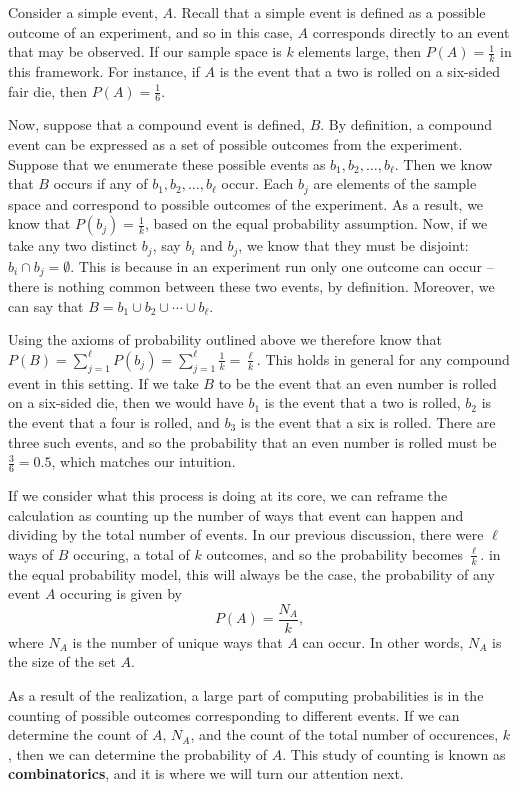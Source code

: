 \documentclass[
  letterpaper,
  DIV=11,
  numbers=noendperiod]{scrreprt}
\begin{document}
Consider a simple event, \(A\). Recall that a simple event is defined as
a possible outcome of an experiment, and so in this case, \(A\)
corresponds directly to an event that may be observed. If our sample
space is \(k\) elements large, then \(P(A) = \frac{1}{k}\) in this
framework. For instance, if \(A\) is the event that a two is rolled on a
six-sided fair die, then \(P(A) = \frac{1}{6}\).

Now, suppose that a compound event is defined, \(B\). By definition, a
compound event can be expressed as a set of possible outcomes from the
experiment. Suppose that we enumerate these possible events as
\(b_1, b_2, \dots, b_\ell\). Then we know that \(B\) occurs if any of
\(b_1,b_2,\dots,b_\ell\) occur. Each \(b_j\) are elements of the sample
space and correspond to possible outcomes of the experiment. As a
result, we know that \(P(b_j) = \frac{1}{k}\), based on the equal
probability assumption. Now, if we take any two distinct \(b_j\), say
\(b_i\) and \(b_j\), we know that they must be disjoint:
\(b_i \cap b_j = \emptyset\). This is because in an experiment run only
one outcome can occur -- there is nothing common between these two
events, by definition. Moreover, we can say that
\(B = b_1 \cup b_2 \cup\cdots\cup b_\ell\).

Using the axioms of probability outlined above we therefore know that
\(P(B) = \sum_{j=1}^\ell P(b_j) = \sum_{j=1}^\ell \frac{1}{k} = \frac{\ell}{k}\).
This holds in general for any compound event in this setting. If we take
\(B\) to be the event that an even number is rolled on a six-sided die,
then we would have \(b_1\) is the event that a two is rolled, \(b_2\) is
the event that a four is rolled, and \(b_3\) is the event that a six is
rolled. There are three such events, and so the probability that an even
number is rolled must be \(\frac{3}{6} = 0.5\), which matches our
intuition.

If we consider what this process is doing at its core, we can reframe
the calculation as counting up the number of ways that event can happen
and dividing by the total number of events. In our previous discussion,
there were \(\ell\) ways of \(B\) occuring, a total of \(k\) outcomes,
and so the probability becomes \(\frac{\ell}{k}\). in the equal
probability model, this will always be the case, the probability of any
event \(A\) occuring is given by \[P(A) = \frac{N_A}{k},\] where \(N_A\)
is the number of unique ways that \(A\) can occur. In other words,
\(N_A\) is the size of the set \(A\).

As a result of the realization, a large part of computing probabilities
is in the counting of possible outcomes corresponding to different
events. If we can determine the count of \(A\), \(N_A\), and the count
of the total number of occurences, \(k\), then we can determine the
probability of \(A\). This study of counting is known as
\textbf{combinatorics}, and it is where we will turn our attention next.
\end{document}
